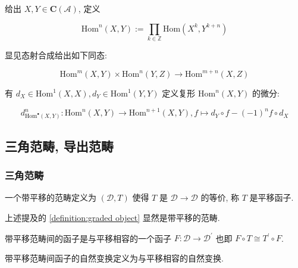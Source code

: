 \begin{definition}
    给出 \(X,Y \in \mathbf{C} (\mathcal{A})\), 定义

    \[
        \mathrm{Hom}^n (X,Y) := \prod_{k \in \mathbb{Z}} \mathrm{Hom} (X^k,Y^{k+n})
    \]

    显见态射合成给出如下同态:

    \[
        \mathrm{Hom}^m (X,Y) \times \mathrm{Hom}^n (Y,Z) \to \mathrm{Hom}^{m+n} (X,Z)
    \]

    有 \(d_X \in \mathrm{Hom}^1 (X,X),d_Y \in \mathrm{Hom}^1 (Y,Y)\) 定义复形 \(\mathrm{Hom}^n (X,Y)\) 的微分:

    \[
        d^n_{\mathrm{Hom}^\bullet (X,Y)} : \mathrm{Hom}^n (X,Y) \to \mathrm{Hom}^{n+1} (X,Y), f \mapsto d_Y \circ f - (-1)^n f \circ d_X
    \]
\end{definition}

\newpage

\subsection{三角范畴, 导出范畴}

\subsubsection{三角范畴}

\begin{definition}[平移]
    一个带平移的范畴定义为 \((\mathcal{D},T)\) 使得 \(T\) 是 \(\mathcal{D} \to \mathcal{D}\) 的等价,
    称 \(T\) 是平移函子.
\end{definition}

\begin{corollary}
    上述提及的 \ref{definition:graded object} 显然是带平移的范畴.
\end{corollary}

\begin{definition}
    带平移范畴间的函子是与平移相容的一个函子 \(F : \mathcal{D} \to \mathcal{D}^\prime\) 也即 \(F \circ T \cong T^\prime \circ F\).
\end{definition}

\begin{definition}
    带平移范畴间函子的自然变换定义为与平移相容的自然变换.

    \begin{center}
    \end{center}
\end{definition}

